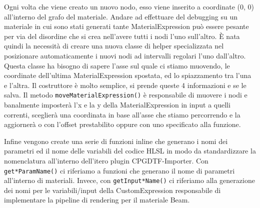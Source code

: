 \documentclass[main.tex]{subfiles}
\begin{document}
Ogni volta che viene creato un nuovo nodo, esso viene inserito a coordinate (0, 0) all'interno del grafo del materiale. Andare ad effettuare del debugging su un materiale in cui sono stati generati tante MaterialExpression può essere pesante per via del disordine che si crea nell'avere tutti i nodi l'uno sull'altro. È nata quindi la necessità di creare una nuova classe di helper specializzata nel posizionare automaticamente i nuovi nodi ad intervalli regolari l'uno dall'altro. \newline
Questa classe ha bisogno di sapere l'asse sul quale ci stiamo muovendo, le coordinate dell'ultima MaterialExpression spostata, ed lo spiazzamento tra l'una e l'altra. Il costruttore è molto semplice, si prende queste 4 informazioni e se le salva. Il metodo \lstinline{moveMaterialExpression()} è responsabile di muovere i nodi e banalmente imposterà l'x e la y della MaterialExpression in input a quelli correnti, sceglierà una coordinata in base all'asse che stiamo percorrendo e la aggiornerà o con l'offset prestabilito oppure con uno specificato alla funzione.
\clearpage %
%
%
%
%

Infine vengono create una serie di funzioni inline che generano i nomi dei parametri ed il nome delle variabili del codice HLSL in modo da standardizzare la nomenclatura all'interno dell'itero plugin CPGDTF-Importer. Con \lstinline{get*ParamName()} ci riferiamo a funzioni che generano il nome di parametri all'interno di materiali. Invece, con \lstinline{getInput*Name()} ci riferiamo alla generazione dei nomi per le variabili/input della CustomExpression responsabile di implementare la pipeline di rendering per il materiale Beam.
\end{document}
